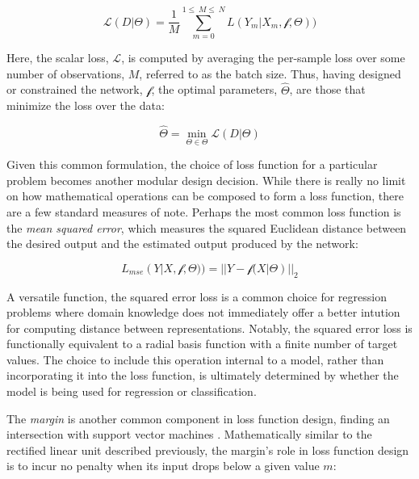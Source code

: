 \begin{equation}
\label{eq:genloss}
\mathcal{L}(D | \Theta) =  \frac{1}{M}\sum_{m=0}^{1\leq~M\leq~N}L(Y_m | X_m, \mathcal{f}, \Theta))
\end{equation}

\noindent Here, the scalar loss, $\mathcal{L}$, is computed by averaging the per-sample loss over some number of observations, $M$, referred to as the batch size.
Thus, having designed or constrained the network, $\mathcal{f}$, the optimal parameters, $\hat{\Theta}$, are those that minimize the loss over the data:

\begin{equation}
\label{eq:genloss}
\hat{\Theta} = \min\limits_{\Theta \in \mathcal{\Theta}}\mathcal{L}(D | \Theta)
\end{equation}

Given this common formulation, the choice of loss function for a particular problem becomes another modular design decision.
While there is really no limit on how mathematical operations can be composed to form a loss function, there are a few standard measures of note.
Perhaps the most common loss function is the \emph{mean squared error}, which measures the squared Euclidean distance between the desired output and the estimated output produced by the network:

\begin{equation}
\label{eq:mse}
L_{mse}(Y | X, \mathcal{f}, \Theta)) = || Y - \mathcal{f}(X | \Theta) ||_2
\end{equation}

\noindent A versatile function, the squared error loss is a common choice for regression problems where domain knowledge does not immediately offer a better intution for computing distance between representations.
Notably, the squared error loss is functionally equivalent to a radial basis function with a finite number of target values.
The choice to include this operation internal to a model, rather than incorporating it into the loss function, is ultimately determined by whether the model is being used for regression or classification.

The \emph{margin} is another common component in loss function design, finding an intersection with support vector machines \cite{}.
Mathematically similar to the rectified linear unit described previously, the margin's role in loss function design is to incur no penalty when its input drops below a given value $m$:

